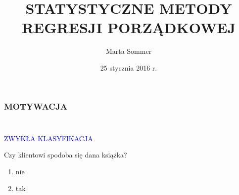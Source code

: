 \documentclass[11pt,usenames,dvipsnames,rgb,svgnames,x11names]{beamer}
\title{STATYSTYCZNE METODY \newline REGRESJI PORZĄDKOWEJ}
\author{Marta Sommer}
\institute{MiNI, Politechnika Warszawska}
\date{25 stycznia 2016 r.}
\theoremstyle{plain}
\theoremstyle{definition}
\theoremstyle{remark}
\begin{document}
\begin{frame}
	\titlepage
\end{frame}



\begin{frame}
\frametitle{\textbf{MOTYWACJA}}

\begin{columns}[T]
\begin{column}{0.7\textwidth}
\centering
\textcolor{blue}{}
\end{column}

\begin{column}{0.3\textwidth}
\centering
\textcolor{blue}{}
\end{column}
\end{columns}


\begin{columns}[T]

\begin{column}{0.3\textwidth}
\begin{center}
\textcolor{blue}{ZWYKŁA KLASYFIKACJA}
\end{center}
Czy klientowi spodoba się dana książka?
\begin{enumerate}[1)]
\item \textcolor{jeden}{nie}
\item \textcolor{piec}{tak}
\end{enumerate}
\end{column}


\end{columns}
\end{frame}
\end{document}
